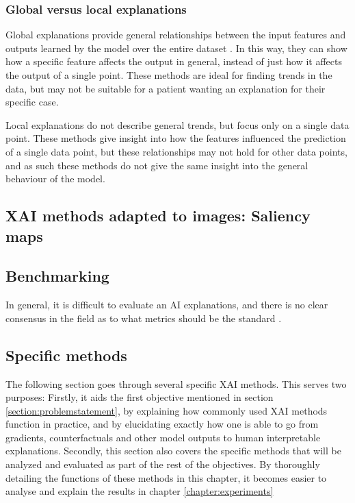 \documentclass[UKenglish]{uiomasterthesis} %
\theoremstyle{definition}
\begin{document}
\subsubsection{Global versus local explanations}

Global explanations provide general relationships between the input features and outputs learned by the model over the entire dataset \cite{xaioverview}. In this way, they can show how a specific feature affects the output in general, instead of just how it affects the output of a single point. These methods are ideal for finding trends in the data, but may not be suitable for a patient wanting an explanation for their specific case.

Local explanations do not describe general trends, but focus only on a single data point. These methods give insight into how the features influenced the prediction of a single data point, but these relationships may not hold for other data points, and as such these methods do not give the same insight into the general behaviour of the model.

\subsection{XAI methods adapted to images: Saliency maps}

\subsection{Benchmarking}

In general, it is difficult to evaluate an AI explanations, and there is no clear consensus in the field as to what metrics should be the standard \cite{molnar, evalxai}.

\subsection{Specific methods}

The following section goes through several specific XAI methods. This serves two purposes: Firstly, it aids the first objective mentioned in section \ref{section:problemstatement}, by explaining how commonly used XAI methods function in practice, and by elucidating exactly how one is able to go from gradients, counterfactuals and other model outputs to human interpretable explanations. Secondly, this section also covers the specific methods that will be analyzed and evaluated as part of the rest of the objectives. By thoroughly detailing the functions of these methods in this chapter, it becomes easier to analyse and explain the results in chapter \ref{chapter:experiments}
\\
\end{document}
